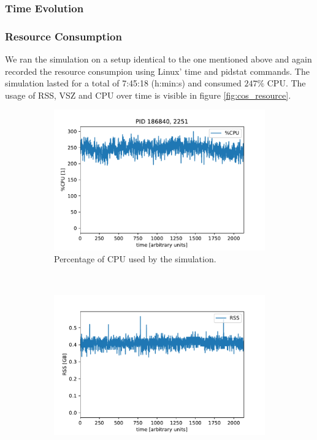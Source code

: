 \documentclass{article}
\begin{document}
\subsubsection{Time Evolution}

\subsubsection{Resource Consumption}
We ran the simulation on a setup identical to the one mentioned above and again recorded the resource consumpion using Linux' time and pidstat commands. The simulation lasted for a total of 7:45:18 (h:min:s) and consumed $247 \%$ CPU. The usage of RSS, VSZ and CPU over time is visible in figure \ref{fig:cos_resource}.
\begin{figure}[H]
  \begin{subfigure}[b]{0.5 \textwidth}
    \includegraphics[width = \textwidth]{../parser/cospot_perCPU.pdf}
    \caption{Percentage of CPU used by the simulation.}
  \end{subfigure}
  ~
  \begin{subfigure}[b]{0.5 \textwidth}
    \includegraphics[width = \textwidth]{../parser/cospot_RSS.pdf}

\end{subfigure}
\end{figure}
\end{document}
